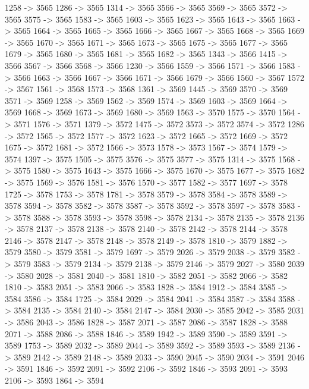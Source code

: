 {	1258 -> 3565
	1286 -> 3565
	1314 -> 3565
	3566 -> 3565
	3569 -> 3565
	3572 -> 3565
	3575 -> 3565
	1583 -> 3565
	1603 -> 3565
	1623 -> 3565
	1643 -> 3565
	1663 -> 3565
	1664 -> 3565
	1665 -> 3565
	1666 -> 3565
	1667 -> 3565
	1668 -> 3565
	1669 -> 3565
	1670 -> 3565
	1671 -> 3565
	1673 -> 3565
	1675 -> 3565
	1677 -> 3565
	1679 -> 3565
	1680 -> 3565
	1681 -> 3565
	1682 -> 3565
	1343 -> 3566
	1415 -> 3566
	3567 -> 3566
	3568 -> 3566
	1230 -> 3566
	1559 -> 3566
	1571 -> 3566
	1583 -> 3566
	1663 -> 3566
	1667 -> 3566
	1671 -> 3566
	1679 -> 3566
	1560 -> 3567
	1572 -> 3567
	1561 -> 3568
	1573 -> 3568
	1361 -> 3569
	1445 -> 3569
	3570 -> 3569
	3571 -> 3569
	1258 -> 3569
	1562 -> 3569
	1574 -> 3569
	1603 -> 3569
	1664 -> 3569
	1668 -> 3569
	1673 -> 3569
	1680 -> 3569
	1563 -> 3570
	1575 -> 3570
	1564 -> 3571
	1576 -> 3571
	1379 -> 3572
	1475 -> 3572
	3573 -> 3572
	3574 -> 3572
	1286 -> 3572
	1565 -> 3572
	1577 -> 3572
	1623 -> 3572
	1665 -> 3572
	1669 -> 3572
	1675 -> 3572
	1681 -> 3572
	1566 -> 3573
	1578 -> 3573
	1567 -> 3574
	1579 -> 3574
	1397 -> 3575
	1505 -> 3575
	3576 -> 3575
	3577 -> 3575
	1314 -> 3575
	1568 -> 3575
	1580 -> 3575
	1643 -> 3575
	1666 -> 3575
	1670 -> 3575
	1677 -> 3575
	1682 -> 3575
	1569 -> 3576
	1581 -> 3576
	1570 -> 3577
	1582 -> 3577
	1697 -> 3578
	1725 -> 3578
	1753 -> 3578
	1781 -> 3578
	3579 -> 3578
	3584 -> 3578
	3589 -> 3578
	3594 -> 3578
	3582 -> 3578
	3587 -> 3578
	3592 -> 3578
	3597 -> 3578
	3583 -> 3578
	3588 -> 3578
	3593 -> 3578
	3598 -> 3578
	2134 -> 3578
	2135 -> 3578
	2136 -> 3578
	2137 -> 3578
	2138 -> 3578
	2140 -> 3578
	2142 -> 3578
	2144 -> 3578
	2146 -> 3578
	2147 -> 3578
	2148 -> 3578
	2149 -> 3578
	1810 -> 3579
	1882 -> 3579
	3580 -> 3579
	3581 -> 3579
	1697 -> 3579
	2026 -> 3579
	2038 -> 3579
	3582 -> 3579
	3583 -> 3579
	2134 -> 3579
	2138 -> 3579
	2146 -> 3579
	2027 -> 3580
	2039 -> 3580
	2028 -> 3581
	2040 -> 3581
	1810 -> 3582
	2051 -> 3582
	2066 -> 3582
	1810 -> 3583
	2051 -> 3583
	2066 -> 3583
	1828 -> 3584
	1912 -> 3584
	3585 -> 3584
	3586 -> 3584
	1725 -> 3584
	2029 -> 3584
	2041 -> 3584
	3587 -> 3584
	3588 -> 3584
	2135 -> 3584
	2140 -> 3584
	2147 -> 3584
	2030 -> 3585
	2042 -> 3585
	2031 -> 3586
	2043 -> 3586
	1828 -> 3587
	2071 -> 3587
	2086 -> 3587
	1828 -> 3588
	2071 -> 3588
	2086 -> 3588
	1846 -> 3589
	1942 -> 3589
	3590 -> 3589
	3591 -> 3589
	1753 -> 3589
	2032 -> 3589
	2044 -> 3589
	3592 -> 3589
	3593 -> 3589
	2136 -> 3589
	2142 -> 3589
	2148 -> 3589
	2033 -> 3590
	2045 -> 3590
	2034 -> 3591
	2046 -> 3591
	1846 -> 3592
	2091 -> 3592
	2106 -> 3592
	1846 -> 3593
	2091 -> 3593
	2106 -> 3593
	1864 -> 3594
}
